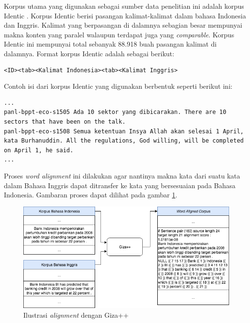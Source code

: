 Korpus utama yang digunakan sebagai sumber data penelitian ini adalah korpus Identic \citep{larasati2012identic}. Korpus Identic berisi pasangan kalimat-kalimat dalam bahasa Indonesia dan Inggris. Kalimat yang berpasangan di dalamnya sebagian besar mempunyai makna konten yang paralel walaupun terdapat juga yang \textit{comparable}. Korpus Identic ini mempunyai total sebanyak 88.918 buah pasangan kalimat di dalamnya. Format korpus Identic adalah sebagai berikut:
\begin{lstlisting}
<ID><tab><Kalimat Indonesia><tab><Kalimat Inggris>
\end{lstlisting}
\clearpage
Contoh isi dari korpus Identic yang digunakan berbentuk seperti berikut ini:
\begin{lstlisting}[backgroundcolor = \color{white}]
...
panl-bppt-eco-s1505	Ada 10 sektor yang dibicarakan.	There are 10 sectors that have been on the talk.
panl-bppt-eco-s1508	Semua ketentuan Insya Allah akan selesai 1 April, kata Burhanuddin.	All the regulations, God willing, will be completed on April 1, he said.
...
\end{lstlisting}


Proses \textit{word alignment} ini dilakukan agar nantinya makna kata dari suatu kata dalam Bahasa Inggris dapat ditransfer ke kata yang bersesuaian pada Bahasa Indonesia. Gambaran proses dapat dilihat pada gambar \ref{fig:giza-aligning}.

\begin{figure}
	\centering
	\includegraphics[width=1\linewidth]{adit_pics/giza-process.png}
	\caption{Ilustrasi \textit{alignment} dengan Giza++}
	\label{fig:giza-aligning}
\end{figure}

